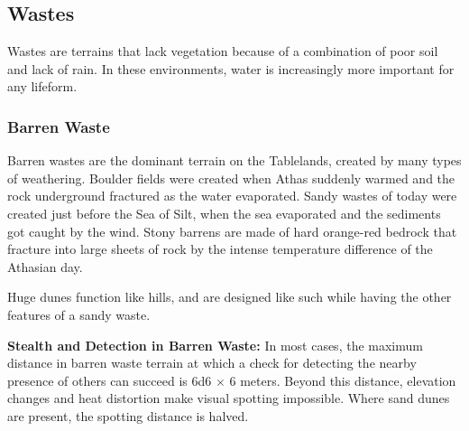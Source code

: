 \subsection{Wastes}
Wastes are terrains that lack vegetation because of a combination of poor soil and lack of rain. In these environments, water is increasingly more important for any lifeform.

\subsubsection{Barren Waste}
Barren wastes are the dominant terrain on the Tablelands, created by many types of weathering. Boulder fields were created when Athas suddenly warmed and the rock underground fractured as the water evaporated. Sandy wastes of today were created just before the Sea of Silt, when the sea evaporated and the sediments got caught by the wind. Stony barrens are made of hard orange-red bedrock that fracture into large sheets of rock by the intense temperature difference of the Athasian day.

Huge dunes function like hills, and are designed like such while having the other features of a sandy waste.


\textbf{Stealth and Detection in Barren Waste:} In most cases, the maximum distance in barren waste terrain at which a  check for detecting the nearby presence of others can succeed is 6d6 $\times$ 6 meters. Beyond this distance, elevation changes and heat distortion make visual spotting impossible. Where sand dunes are present, the spotting distance is halved.

